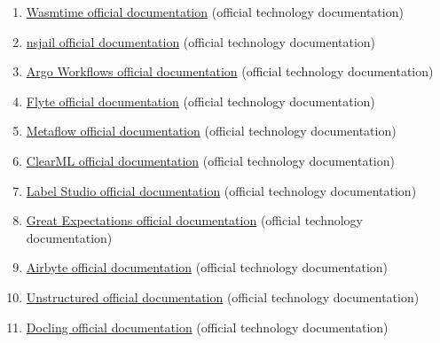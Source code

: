\begin{enumerate}
\item \href{https://docs.wasmtime.dev/}{Wasmtime official documentation} (official technology documentation)
\item \href{https://github.com/google/nsjail}{nsjail official documentation} (official technology documentation)
\item \href{https://argo-workflows.readthedocs.io/}{Argo Workflows official documentation} (official technology documentation)
\item \href{https://docs.flyte.org/}{Flyte official documentation} (official technology documentation)
\item \href{https://docs.metaflow.org/}{Metaflow official documentation} (official technology documentation)
\item \href{https://clear.ml/docs/latest/docs/}{ClearML official documentation} (official technology documentation)
\item \href{https://labelstud.io/guide/}{Label Studio official documentation} (official technology documentation)
\item \href{https://docs.greatexpectations.io/docs/}{Great Expectations official documentation} (official technology documentation)
\item \href{https://docs.airbyte.com/}{Airbyte official documentation} (official technology documentation)
\item \href{https://docs.unstructured.io/}{Unstructured official documentation} (official technology documentation)
\item \href{https://docling-project.github.io/docling/}{Docling official documentation} (official technology documentation)
\end{enumerate}

